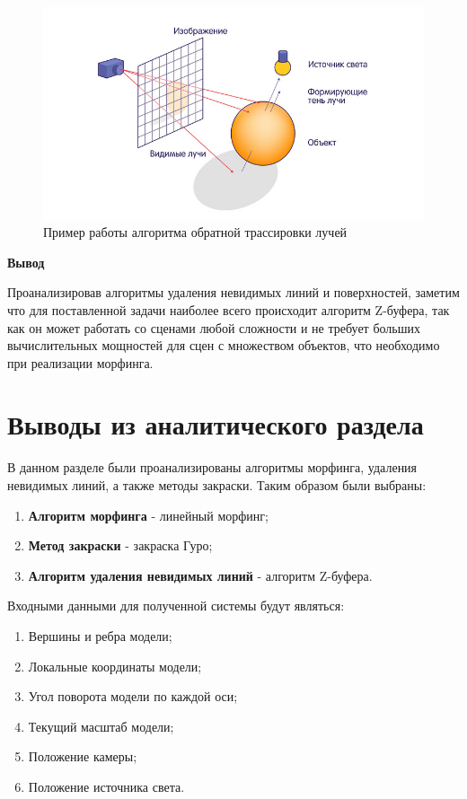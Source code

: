 \begin{figure}[H]
	\centering
	\includegraphics[scale=3]{images/ray_traycing.jpeg}
	\caption{Пример работы алгоритма обратной трассировки лучей}
	\label{fig:ray_traycing}
\end{figure}

\textbf{Вывод}

Проанализировав алгоритмы удаления невидимых линий и поверхностей, заметим что для поставленной задачи наиболее всего происходит алгоритм Z-буфера, так как он может работать со сценами любой сложности и не требует больших вычислительных мощностей для сцен с множеством объектов, что  необходимо при реализации морфинга.


\section*{Выводы из аналитического раздела}

В данном разделе были проанализированы алгоритмы морфинга, удаления невидимых линий, а также методы закраски.
Таким образом были выбраны:
\begin{enumerate}
	\item \textbf{Алгоритм морфинга} - линейный морфинг;
	\item \textbf{Метод закраски} - закраска Гуро;
	\item \textbf{Алгоритм удаления невидимых линий} - алгоритм Z-буфера.
\end{enumerate}

Входными данными для полученной системы будут являться:
\begin{enumerate}
	\item Вершины и ребра модели;
	\item Локальные координаты модели;
	\item Угол поворота модели по каждой оси;
	\item Текущий масштаб модели;
	\item Положение камеры;
	\item Положение источника света.
\end{enumerate}